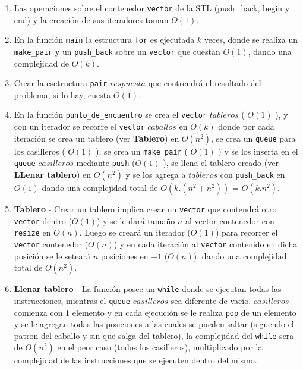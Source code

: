 \begin{enumerate}

 \item Las operaciones sobre el contenedor \verb|vector| de la STL (push_back, 
 begin y end) y la creación de sus iteradores toman $O(1)$.
 
 \item En la función \verb|main| la estructura \verb|for| es ejecutada
  $k$ veces, donde se realiza un \verb|make_pair| y un \verb|push_back| 
  sobre un \verb|vector| que cuestan $O(1)$, dando una complejidad de $O(k)$.
   
 \item Crear la esctructura \verb|pair| $respuesta$ que contrendrá el 
 resultado del problema, si lo hay, cuesta $O(1)$.
 
 \item En la función \verb|punto_de_encuentro| se crea el \verb|vector| 
 $tableros$ ( $O(1)$ ), y con un iterador se recorre el \verb|vector| $caballos$ en 
 $O(k)$ donde por cada iteración se crea un tablero (ver \textbf{Tablero}) 
 en $O(n^{2})$, se crea un \verb|queue| para los casilleros ( $O(1)$ ), 
 se crea un \verb|make_pair| ( $O(1)$ ) y se los inserta en el \verb|queue| $casilleros$
 mediante \verb|push| ($ O(1)$ ), se llena el tablero creado (ver \textbf{LLenar tablero}) 
 en $O(n^{2})$ y se los agrega a $tableros$ con \verb|push_back| en $O(1)$
  dando una complejidad total de $O(k.(n^{2} + n^{2}))$ = $O(k.n^{2})$.
 
 \item \textbf{Tablero} - Crear un tablero implica crear un \verb|vector| 
 que contendrá otro \verb|vector| dentro ($O(1)$) y se le dará tamaño $n$
 al vector contenedor con \verb|resize| en $O(n)$. Luego se creará un iterador
 ($O(1)$) para recorrer el \verb|vector| contenedor ($O(n)$) y en cada iteración
 al \verb|vector| contenido en dicha posición se le seteará $n$ posiciones
 en $-1$ ($O(n)$), dando una complejidad total de $O(n^{2})$.
 
 \item \textbf{Llenar tablero} - La función posee un \verb|while| donde se ejecutan
 todas las instrucciones, mientras el \verb|queue| $casilleros$ sea diferente de vacío.
 $casilleros$ comienza con 1 elemento y en cada ejecución se le realiza
 \verb|pop| de un elemento y se le agregan todas las posiciones a las cuales se 
 pueden saltar (siguendo el patron del caballo y sin que salga del tablero), la 
 complejidad del \verb|while| sera de $O(n^{2})$ en el peor caso (todos los casilleros), multiplicado 
 por la complejidad de las instrucciones que se ejecuten dentro del mismo.
 

\end{enumerate}
